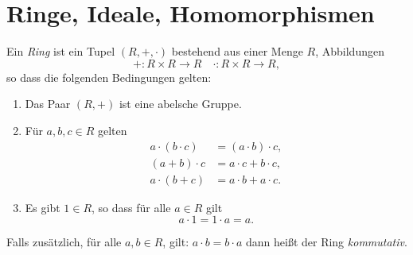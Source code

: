 \documentclass{book}
\begin{document}
\section{Ringe, Ideale, Homomorphismen }%
\label{sec:ringe_ideale_homomorphismen}

\begin{defi}
    \label{defi:ring}
    Ein {\em Ring} ist ein Tupel $(R,+,\cdot)$ bestehend aus einer Menge
    $R$, Abbildungen 
    \[
        + : R \times R \to R \quad \cdot : R \times R \to R,
    \]
    so dass die folgenden Bedingungen gelten:
    \begin{enumerate}
        \item Das Paar $(R,+)$ ist eine abelsche Gruppe.
        \item Für $a,b,c \in R$ gelten 
            \begin{align*}
                a \cdot (b \cdot c)  & = (a \cdot b) \cdot c,\\
                (a+b) \cdot c  & = a \cdot c + b \cdot c,\\
                a \cdot (b+c)  & = a \cdot b + a \cdot c.
            \end{align*}
        \item Es gibt $1 \in R$, so dass für alle $a \in R$ gilt
            \[
                a \cdot 1 = 1 \cdot a = a.
            \]
    \end{enumerate}
    Falls zusätzlich, für alle $a,b \in R$, gilt: $a \cdot b = b \cdot a$ dann
    heißt der Ring {\em kommutativ}.
\end{defi}
\end{document}
